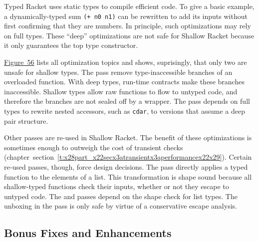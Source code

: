 \documentclass[ twoside,open=right,titlepage,numbers=noenddot,headinclude,%
                footinclude=true,cleardoublepage=empty,abstract=off,
                BCOR=5mm,paper=a4,fontsize=11pt,%
                ngerman,american,%
                parts,pdfspacing]{scrreprt}
\newcommand{\SecRef}[2]{section~#1}
\newcommand{\SecRefLocal}[3]{\hyperref[#1]{\SecRef{#2}{#3}}}
\newcommand{\Scribtexttt}[1]{{\texttt{#1}}}
\newcommand{\Ssubsubsection}[2]{\subsubsection[#1]{#2}}
\newcommand{\FigureRef}[2]{#1}
\renewcommand{\Ssubsubsection}[2]{\subsection[#1]{#2}}
\renewcommand{\SecRefLocal}[3]{section~\ref{#1}}
\begin{document}
Typed Racket uses static types to compile efficient code.
To give a basic example, a dynamically{-}typed sum \Scribtexttt{(+ n0 n1)} can be
 rewritten to add its inputs without first confirming that they are numbers.
In principle, such optimizations may rely on full types.
These {``}deep{''} optimizations are not safe for Shallow Racket because it only
 guarantees the top type constructor.

\hyperref[t:x28counter_x28x22figurex22_x22figx3atransientx3aoptimizex22x29x29]{Figure~\FigureRef{56}{t:x28counter_x28x22figurex22_x22figx3atransientx3aoptimizex22x29x29}} lists all optimization topics and shows,
 suprisingly, that only two are unsafe for shallow types.
The  pass remove type{-}inaccessible branches of an overloaded function.
With deep types, run{-}time contracts make these branches inaccessible.
Shallow types allow raw functions to flow to untyped code, and therefore
 the branches are not sealed off by a wrapper.
The  pass depends on full types to rewrite nested accessors, such as \Scribtexttt{cdar},
 to versions that assume a deep pair structure.

Other passes are re{-}used in Shallow Racket.
The benefit of these optimizations is sometimes enough to outweigh the cost
 of transient checks (chapter~\SecRefLocal{t:x28part_x22secx3atransientx3aperformancex22x29}{5.4}{Performance}).
Certain re{-}used passes, though, force design decisions.
The  pass directly applies a typed function to the elements
 of a list.
This transformation is shape sound because all shallow{-}typed functions
 check their inputs, whether or not they escape to untyped code.
The  and  passes depend on the 
 shape check for list types.
The unboxing in the  pass is only safe by virtue
 of a conservative escape analysis.

\Ssubsubsection{Bonus Fixes and Enhancements}{Bonus Fixes and Enhancements}\label{t:x28part_x22secx3atransientx3aprx22x29}
\end{document}
